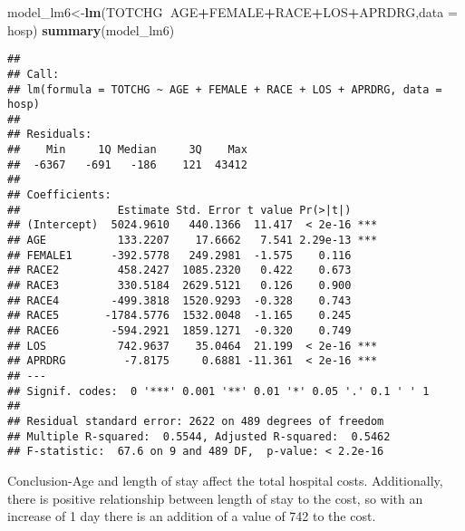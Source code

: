 \documentclass[
]{article}
\newenvironment{Shaded}{\begin{snugshade}}{\end{snugshade}}
\newcommand{\DataTypeTok}[1]{\textcolor[rgb]{0.13,0.29,0.53}{#1}}
\newcommand{\KeywordTok}[1]{\textcolor[rgb]{0.13,0.29,0.53}{\textbf{#1}}}
\newcommand{\NormalTok}[1]{#1}
\newcommand{\OperatorTok}[1]{\textcolor[rgb]{0.81,0.36,0.00}{\textbf{#1}}}
\begin{document}
\begin{Shaded}
\begin{Highlighting}[]
\NormalTok{model_lm6<-}\KeywordTok{lm}\NormalTok{(TOTCHG}\OperatorTok{~}\NormalTok{AGE}\OperatorTok{+}\NormalTok{FEMALE}\OperatorTok{+}\NormalTok{RACE}\OperatorTok{+}\NormalTok{LOS}\OperatorTok{+}\NormalTok{APRDRG,}\DataTypeTok{data =}\NormalTok{ hosp) }
\KeywordTok{summary}\NormalTok{(model_lm6) }
\end{Highlighting}
\end{Shaded}

\begin{verbatim}
## 
## Call:
## lm(formula = TOTCHG ~ AGE + FEMALE + RACE + LOS + APRDRG, data = hosp)
## 
## Residuals:
##    Min     1Q Median     3Q    Max 
##  -6367   -691   -186    121  43412 
## 
## Coefficients:
##               Estimate Std. Error t value Pr(>|t|)    
## (Intercept)  5024.9610   440.1366  11.417  < 2e-16 ***
## AGE           133.2207    17.6662   7.541 2.29e-13 ***
## FEMALE1      -392.5778   249.2981  -1.575    0.116    
## RACE2         458.2427  1085.2320   0.422    0.673    
## RACE3         330.5184  2629.5121   0.126    0.900    
## RACE4        -499.3818  1520.9293  -0.328    0.743    
## RACE5       -1784.5776  1532.0048  -1.165    0.245    
## RACE6        -594.2921  1859.1271  -0.320    0.749    
## LOS           742.9637    35.0464  21.199  < 2e-16 ***
## APRDRG         -7.8175     0.6881 -11.361  < 2e-16 ***
## ---
## Signif. codes:  0 '***' 0.001 '**' 0.01 '*' 0.05 '.' 0.1 ' ' 1
## 
## Residual standard error: 2622 on 489 degrees of freedom
## Multiple R-squared:  0.5544, Adjusted R-squared:  0.5462 
## F-statistic:  67.6 on 9 and 489 DF,  p-value: < 2.2e-16
\end{verbatim}

Conclusion-Age and length of stay affect the total hospital costs.
Additionally, there is positive relationship between length of stay to
the cost, so with an increase of 1 day there is an addition of a value
of 742 to the cost.
\end{document}
